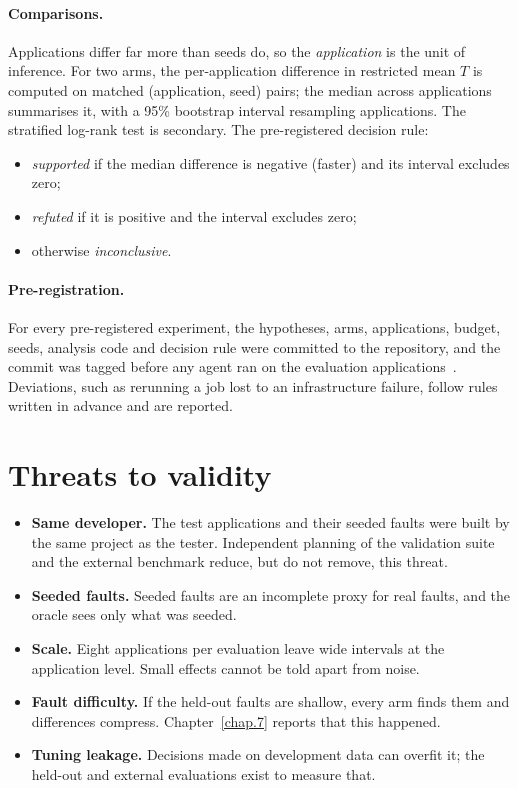 \paragraph{Comparisons.} Applications differ far more than seeds do, so the
\emph{application} is the unit of inference. For two arms, the per-application difference
in restricted mean $T$ is computed on matched (application, seed) pairs; the median across
applications summarises it, with a 95\% bootstrap interval resampling
applications. The stratified log-rank test is
secondary. The pre-registered decision rule:
\begin{itemize}[noitemsep]
  \item \emph{supported} if the median difference is negative (faster) and its interval
        excludes zero;
  \item \emph{refuted} if it is positive and the interval excludes zero;
  \item otherwise \emph{inconclusive}.
\end{itemize}

\paragraph{Pre-registration.} For every pre-registered experiment, the hypotheses, arms,
applications, budget, seeds, analysis code and decision rule were committed to the
repository, and the commit was tagged before any agent ran on the evaluation
applications~\cite{klees2018evaluating}. Deviations, such as rerunning a job lost to an
infrastructure failure, follow rules written in advance and are reported.

\section{Threats to validity}
\label{sec:threats}

\begin{itemize}
  \item \textbf{Same developer.} The test applications and their seeded faults were built
        by the same project as the tester. Independent planning of the validation suite and
        the external benchmark reduce, but do not remove, this threat.
  \item \textbf{Seeded faults.} Seeded faults are an incomplete proxy for real
        faults, and the oracle sees only what was seeded.
  \item \textbf{Scale.} Eight applications per evaluation leave wide intervals at the
        application level. Small effects cannot be told apart from noise.
  \item \textbf{Fault difficulty.} If the held-out faults are shallow, every arm finds them
        and differences compress. Chapter~\ref{chap.7} reports that this happened.
  \item \textbf{Tuning leakage.} Decisions made on development data can overfit it; the
        held-out and external evaluations exist to measure that.
\end{itemize}
